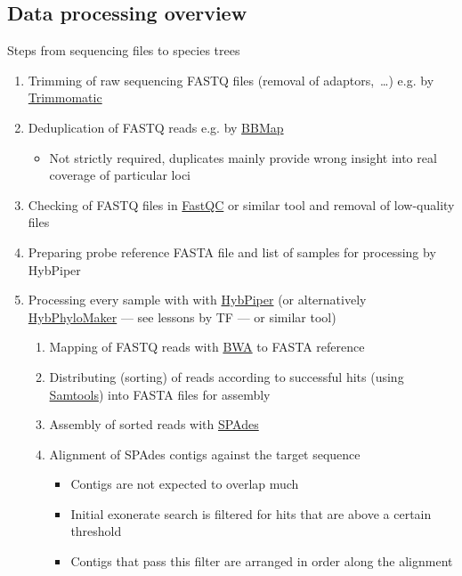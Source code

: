\documentclass[compress, ucs, xelatex, 11pt, xcolor=x11names, aspectratio=169,
	hyperref={
		bookmarks=true,
		unicode=true,
		colorlinks=true,
		pdftitle={HybSeq course},
		plainpages=false,
		pdfauthor={Vojtech Zeisek},
		pdfsubject={Practical processing of HybSeq target enrichment sequencing data on computing grids like MetaCentrum},
		pdfcreator={XeLaTeX},
		pdfkeywords={BASH, command line, GNU, HybSeq, Linux, MetaCentrum, sequencing shell, target enrichment},
		linkcolor=Turquoise4, %
		anchorcolor=DodgerBlue4, %
		citecolor=DodgerBlue4, %
		filecolor=DodgerBlue4, %
		menucolor=Tan4, %
		urlcolor=DarkOliveGreen4, %
		pdftex},
	url={hyphens, lowtilde} %
	]{beamer}
\begin{document}
\subsection{Data processing overview}

\begin{frame}[allowframebreaks]{Steps from sequencing files to species trees}
	\begin{enumerate}
		\item Trimming of raw sequencing FASTQ files (removal of adaptors,~\ldots) e.g. by \href{http://www.usadellab.org/cms/?page=trimmomatic}{Trimmomatic}
		\item Deduplication of FASTQ reads e.g. by \href{https://sourceforge.net/projects/bbmap/}{BBMap}
		\begin{itemize}
			\item Not strictly required, duplicates mainly provide wrong insight into real coverage of particular loci
		\end{itemize}
		\item Checking of FASTQ files in \href{https://www.bioinformatics.babraham.ac.uk/projects/fastqc/}{FastQC} or similar tool and removal of low-quality files
		\item Preparing probe reference FASTA file and list of samples for processing by HybPiper
		\item Processing every sample with with \href{https://github.com/mossmatters/HybPiper/wiki}{HybPiper} (or alternatively \href{https://github.com/tomas-fer/HybPhyloMaker}{HybPhyloMaker} --- see lessons by TF --- or similar tool)
		\begin{enumerate}
			\item Mapping of FASTQ reads with \href{https://github.com/lh3/bwa}{BWA} to FASTA reference
			\item Distributing (sorting) of reads according to successful hits (using \href{https://www.htslib.org/}{Samtools}) into FASTA files for assembly
			\item Assembly of sorted reads with \href{https://github.com/ablab/spades}{SPAdes}
			\item Alignment of SPAdes contigs against the target sequence
			\begin{itemize}
				\item Contigs are not expected to overlap much
				\item Initial exonerate search is filtered for hits that are above a certain threshold
				\item Contigs that pass this filter are arranged in order along the alignment

\end{itemize}
\end{enumerate}
\end{enumerate}
\end{frame}
\end{document}
